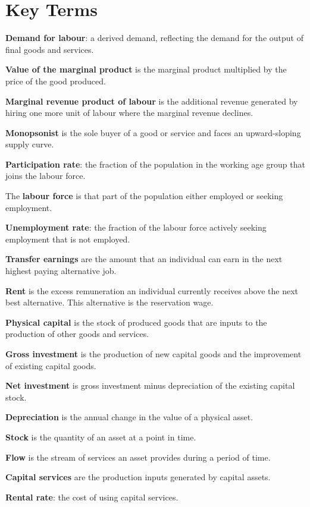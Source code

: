 \newpage
	\section*{Key Terms}
\begin{keyterms}
\textbf{Demand for labour}: a derived demand, reflecting the demand for the output of final goods and services.

\textbf{Value of the marginal product} is the marginal product multiplied by the price of the good produced.

\textbf{Marginal revenue product of labour} is the additional revenue generated by hiring one more unit of labour where the marginal revenue declines.

\textbf{Monopsonist} is the sole buyer of a good or service and faces an upward-sloping supply curve.

\textbf{Participation rate}: the fraction of the population in the working age group that joins the labour force.

The \textbf{labour force} is that part of the population either employed or seeking employment.

\textbf{Unemployment rate}: the fraction of the labour force actively seeking employment that is not employed.

\textbf{Transfer earnings} are the amount that an individual can earn in the next highest paying alternative job.

\textbf{Rent} is the excess remuneration an individual currently receives above the next best alternative. This alternative is the reservation wage.

\textbf{Physical capital} is the stock of produced goods that are inputs to the production of other goods and services.

\textbf{Gross investment} is the production of new capital goods and the improvement of existing capital goods.

\textbf{Net investment} is gross investment minus depreciation of the existing capital stock.

\textbf{Depreciation} is the annual change in the value of a physical asset.

\textbf{Stock} is the quantity of an asset at a point in time.

\textbf{Flow} is the stream of services an asset provides during a period of time.

\textbf{Capital services} are the production inputs generated by capital assets.

\textbf{Rental rate}: the cost of using capital services.


\end{keyterms}
